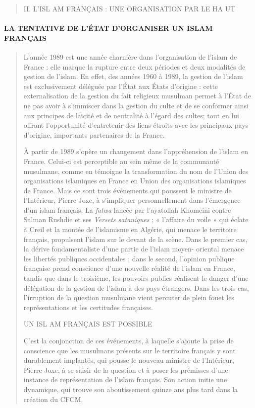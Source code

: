 \begin{quote}
II. L'ISL AM FRANÇAIS : UNE ORGANISATION PAR LE HA UT
\end{quote}

\hypertarget{la-tentative-de-luxe9tat-dorganiser-un-islam-franuxe7ais}{%
\paragraph{LA TENTATIVE DE L'ÉTAT D'ORGANISER UN ISLAM
FRANÇAIS}\label{la-tentative-de-luxe9tat-dorganiser-un-islam-franuxe7ais}}

\begin{quote}
L'année 1989 est une année charnière dans l'organisation de l'islam de
France : elle marque la rupture entre deux périodes et deux modalités de
gestion de l'islam. En effet, des années 1960 à 1989, la gestion de
l'islam est exclusivement déléguée par l'État aux États d'origine :
cette externalisation de la gestion du fait religieux musulman permet à
l'État de ne pas avoir à s'immiscer dans la gestion du culte et de se
conformer ainsi aux principes de laïcité et de neutralité à l'égard des
cultes; tout en lui offrant l'opportunité d'entretenir des liens étroits
avec les principaux pays d'origine, importants partenaires de la France.

À partir de 1989 s'opère un changement dans l'appréhension de l'islam en
France. Celui-ci est perceptible au sein même de la communauté
musulmane, comme en témoigne la transformation du nom de l'Union des
organisations islamiques en France en Union des organisations islamiques
de France. Mais ce sont trois événements qui poussent le ministre de
l'Intérieur, Pierre Joxe, à s'impliquer personnellement dans l'émergence
d'un islam français. La \emph{fatwa} lancée par l'ayatollah Khomeini
contre Salman Rushdie et ses \emph{Versets sataniques} ; « l'affaire du
voile » qui éclate à Creil et la montée de l'islamisme en Algérie, qui
menace le territoire français, propulsent l'islam sur le devant de la
scène. Dans le premier cas, la dérive fondamentaliste d'une partie de
l'islam moyen- oriental menace les libertés publiques occidentales ;
dans le second, l'opinion publique française prend conscience d'une
nouvelle réalité de l'islam en France, tandis que dans le troisième, les
pouvoirs publics réalisent le danger d'une délégation de la gestion de
l'islam à des pays étrangers. Dans les trois cas, l'irruption de la
question musulmane vient percuter de plein fouet les représentations et
les certitudes françaises.

UN ISL AM FRANÇAIS EST POSSIBLE

C'est la conjonction de ces événements, à laquelle s'ajoute la prise de
conscience que les musulmans présents sur le territoire français y sont
durablement implantés, qui pousse le nouveau ministre de l'Intérieur,
Pierre Joxe, à se saisir de la question et à poser les prémisses d'une
instance de représentation de l'islam français. Son action initie une
dynamique, qui trouve son aboutissement quinze ans plus tard dans la
création du CFCM.
\end{quote}

